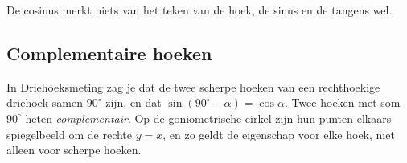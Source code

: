 De cosinus merkt niets van het teken van de hoek, de sinus en de tangens wel.


\begin{oefeningen}
\end{oefeningen}

\subsection{Complementaire hoeken}

In Driehoeksmeting zag je dat de twee scherpe hoeken van een rechthoekige driehoek samen $90^\circ$ zijn, en dat $\sin(90^\circ - \alpha) = \cos\alpha$. Twee hoeken met som $90^\circ$ heten \emph{complementair}. Op de goniometrische cirkel zijn hun punten elkaars spiegelbeeld om de rechte $y = x$, en zo geldt de eigenschap voor elke hoek, niet alleen voor scherpe hoeken.

